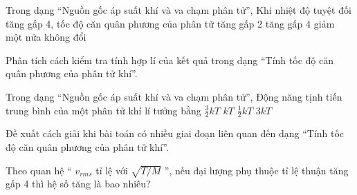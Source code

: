 \begin{ex}
Trong dạng “Nguồn gốc áp suất khí và va chạm phân tử”, Khi nhiệt độ tuyệt đối tăng gấp 4, tốc độ căn quân phương của phân tử
\choice
{\True tăng gấp 2}
{tăng gấp 4}
{giảm một nửa}
{không đổi}
\end{ex}

\begin{ex}
Phân tích cách kiểm tra tính hợp lí của kết quả trong dạng “Tính tốc độ căn quân phương của phân tử khí”.
\choiceTF

\end{ex}

\begin{ex}
Trong dạng “Nguồn gốc áp suất khí và va chạm phân tử”, Động năng tịnh tiến trung bình của một phân tử khí lí tưởng bằng
\choice
{\True $\frac32kT$}
{$kT$}
{$\frac12kT$}
{$3kT$}
\end{ex}

\begin{ex}
Đề xuất cách giải khi bài toán có nhiều giai đoạn liên quan đến dạng “Tính tốc độ căn quân phương của phân tử khí”.
\choiceTF

\end{ex}

\begin{ex}
Theo quan hệ “ $v_{rms}$ tỉ lệ với $\sqrt{T/M}$ ”, nếu đại lượng phụ thuộc tỉ lệ thuận tăng gấp 4 thì hệ số tăng là bao nhiêu?
\end{ex}

